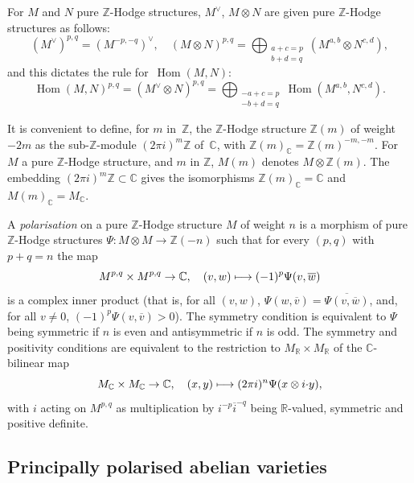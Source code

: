 \documentclass[11pt]{article}
\providecommand{\C}{}
\def\mto{\mathchoice{\longmapsto}{\mapsto}{\mapsto}{\mapsto}}
\let\oldvee\vee
\renewcommand{\vee}{{\scriptscriptstyle\oldvee}}
\theoremstyle{plain}
\theoremstyle{definition}
\numberwithin{equation}{subsection}
\let\ol\overline
\renewcommand{\C}{\mathbb C}
\newcommand{\R}{\mathbb R}
\newcommand{\Z}{\mathbb Z}
\DeclareMathOperator{\Hom}{Hom}
\begin{document}
For $M$ and $N$ pure $\Z$-Hodge structures, $M^\vee$, $M\otimes N$ are
given pure $\Z$-Hodge structures as follows:
\[
(M^\vee)^{p,q} = (M^{-p,-q})^\vee,\quad
(M\otimes N)^{p,q} = \bigoplus_{\substack{a+c=p\\ b+d=q}}
(M^{a,b}\otimes N^{c,d}),
\]
and this dictates the rule for~$\Hom(M,N)$:
\[
\Hom(M,N)^{p,q} = (M^\vee\otimes N)^{p,q}
=\bigoplus_{\substack{-a+c=p\\ -b+d=q}}
\Hom(M^{a,b},N^{c,d}).
\]

It is convenient to define, for $m$ in~$\Z$, the $\Z$-Hodge structure
$\Z(m)$ of weight $-2m$ as the sub-$\Z$-module $(2\pi i)^m\Z$ of~$\C$,
with $\Z(m)_\C=\Z(m)^{-m,-m}$. For $M$ a pure $\Z$-Hodge structure,
and $m$ in $\Z$, $M(m)$ denotes $M\otimes\Z(m)$. The embedding $(2\pi
i)^m\Z\subset\C$ gives the isomorphisms $\Z(m)_\C=\C$ and
$M(m)_\C=M_\C$.

A \emph{polarisation} on a pure $\Z$-Hodge structure $M$ of weight $n$
is a morphism of pure $\Z$-Hodge structures $\Psi\colon M\otimes
M\to\Z(-n)$ such that for every $(p,q)$ with $p+q=n$ the map
\[
M^{p,q}\times M^{p,q}\to \C,\quad (v,w)\mto (-1)^p\Psi(v,\ol{w})
\]
is a complex inner product (that is, for all $(v,w)$,
$\Psi(w,\ol{v})=\ol{\Psi(v,\ol{w})}$, and, for all $v\neq0$,
$(-1)^p\Psi(v,\ol{v})>0$). The symmetry condition is equivalent to
$\Psi$ being symmetric if $n$ is even and
antisymmetric if $n$ is odd. The symmetry and positivity conditions are
equivalent to the restriction to $M_\R\times M_\R$ of the
$\C$-bilinear map
\[
M_\C\times M_\C\to\C,\quad (x,y)\mto (2\pi i)^n\Psi(x\otimes i{\cdot}y),
\]
with $i$ acting on $M^{p,q}$ as multiplication by $i^{-p}\ol{i}^{-q}$
being $\R$-valued, symmetric and positive definite.

\subsection{Principally polarised abelian varieties}
\label{sec:ppavs}
\end{document}
